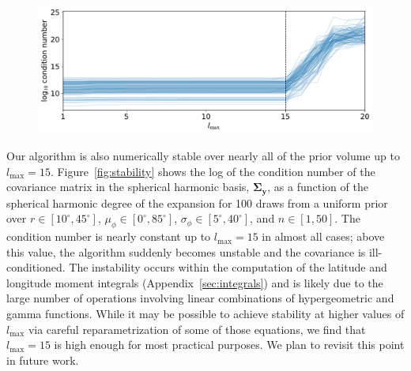 \documentclass[modern]{aastex62}
\begin{document}
\begin{figure}[t!]
    \begin{centering}
        \includegraphics[width=\linewidth]{figures/stability.pdf}
    \end{centering}
\end{figure}

Our algorithm is also numerically stable over nearly all of the prior
volume up to $l_\mathrm{max} = 15$. Figure~\ref{fig:stability}
shows the log of the condition number of the covariance matrix in the
spherical harmonic basis, $\pmb{\Sigma}_\mathbf{y}$, as a function of the
spherical harmonic degree of the expansion for 100 draws from a uniform
prior over $r \in [10^\circ, 45^\circ]$, $\mu_\phi \in [0^\circ, 85^\circ]$,
$\sigma_\phi \in [5^\circ, 40^\circ]$, and $n \in [1, 50]$. The condition
number is nearly constant up to $l_\mathrm{max} = 15$ in almost all cases;
above this value, the algorithm suddenly becomes unstable and the
covariance is ill-conditioned. The instability occurs within the computation
of the latitude and longitude moment integrals (Appendix~\ref{sec:integrals})
and is likely due to the large number of operations involving linear
combinations of hypergeometric and gamma functions. While it may be possible to
achieve stability at higher values of $l_\mathrm{max}$ via careful
reparametrization of some of those equations, we find that $l_\mathrm{max} = 15$
is high enough for most practical purposes. We plan to revisit this point
in future work.
\end{document}
